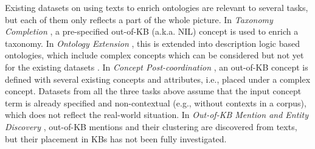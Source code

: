 \documentclass[sigconf]{acmart}
\begin{document}
Existing datasets on using texts to enrich ontologies are relevant to several tasks, but each of them only reflects a part of the whole picture. In \textit{Taxonomy Completion} \cite{Shen2020TaxoExpan,jurgens-pilehvar-2016-semeval}, a pre-specified out-of-KB (a.k.a. NIL) concept is used to enrich a taxonomy. In \textit{Ontology Extension} \cite{glauer2022interpretable}, this is extended into description logic based ontologies, which include complex concepts which can be considered \cite{chen2023contextual,yuan2023ontolama} but not yet for the existing datasets \cite{glauer2022interpretable}. In \textit{Concept Post-coordination} \cite{kate2020,castell2023postcoordination}, an out-of-KB concept is defined with several existing concepts and attributes, i.e., placed under a complex concept. Datasets from all the three tasks above assume that the input concept term is already specified and non-contextual (e.g., without contexts in a corpus), which does not reflect the real-world situation. In \textit{Out-of-KB Mention and Entity Discovery} \cite{Iurshina2022nilk,heist2023nastylinker,dong2023NIL}, out-of-KB mentions and their clustering are discovered from texts, but their placement in KBs has not been fully investigated.
\end{document}
